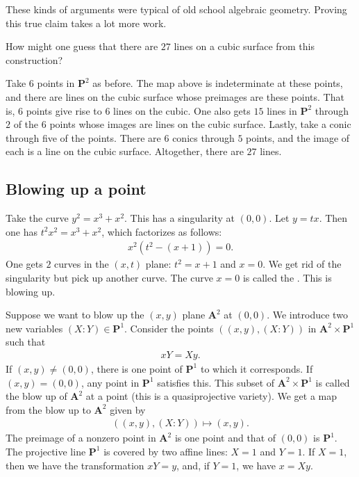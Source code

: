 \documentclass[11pt, oneside,margin=1in]{article}
\begin{document}
These kinds of arguments were typical of old school algebraic geometry. Proving this true claim takes a lot more work.

\begin{problem}
	How might one guess that there are $27$ lines on a cubic surface from this construction?
\end{problem}

Take $6$ points in $\mathbf{P}^2$ as before. The map above is indeterminate at these points, and there are lines on the cubic surface whose preimages are these points. That is, $6$ points give rise to $6$ lines on the cubic. One also gets $15$ lines in $\mathbf{P}^2$ through $2$ of the $6$ points whose images are lines on the cubic surface. Lastly, take a conic through five of the points. There are $6$ conics through $5$ points, and the image of each is a line on the cubic surface. Altogether, there are $27$ lines.
\subsection{Blowing up a point}

\begin{example}[ ]\label{}\text{}
Take the curve $y^2 = x^3 +x^2$. This has a singularity at $(0,0)$. Let $y=tx$. Then one has $t^2x^2 = x^3+x^2$, which factorizes as follows:
\begin{align*}
x^2(t^2 - (x+1)) =0.
\end{align*}
One gets $2$ curves in the $(x,t)$ plane: $t^2=x+1$ and $x=0$. We get rid of the singularity but pick up another curve. The curve $x=0$ is called the . This is blowing up.
\end{example}


Suppose we want to blow up the $(x,y)$ plane $\mathbf{A}^2$ at $(0,0)$. We introduce two new variables $(X:Y)\in  \mathbf{P}^1$. Consider the points $((x,y),  (X:Y))$ in $\mathbf{A}^2\times \mathbf{P}^1$ such that 
\begin{align*}
	xY = Xy.
\end{align*}
If $(x,y)\ne (0,0)$, there is one point of $\mathbf{P}^1$ to which it corresponds. If $(x,y)= (0,0)$, any point in $\mathbf{P}^1$ satisfies this. This subset of $\mathbf{A}^2\times \mathbf{P}^1$ is called the blow up of $\mathbf{A}^2$ at a point (this is a quasiprojective variety). We get a map from the blow up to $\mathbf{A}^2$ given by
\begin{align*}
	((x,y), (X:Y)) \longmapsto (x,y).
\end{align*}
The preimage of a nonzero point in $\mathbf{A}^2$ is one point and that of $(0,0)$ is $\mathbf{P}^1$. The projective line $\mathbf{P}^1$ is covered by two affine lines: $X = 1$ and $Y=1$. If $X=1$, then we have the transformation $xY=y$, and, if $Y=1$, we have $x = Xy$.
\end{document}
